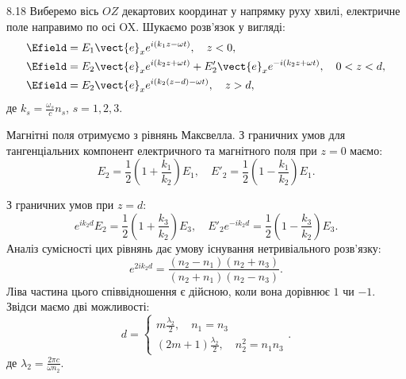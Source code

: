 \begin{Solution}{8.{18}}
    Виберемо вісь $OZ$ декартових координат у напрямку руху хвилі, електричне поле направимо по осі OX. Шукаємо розв’язок у вигляді:
    \begin{align*}
        \Efield &= E_1\vect{e}_x e^{i(k_1z - \omega t)}, \quad z<0, \\
        \Efield &= E_2\vect{e}_x e^{i(k_2z + \omega t)} + E'_2\vect{e}_x e^{-i(k_2z + \omega t)}, \quad 0<z<d, \\
        \Efield &= E_2\vect{e}_x e^{i(k_2(z-d) - \omega t)}, \quad z>d,
    \end{align*}
    де $k_s = \frac{\omega_s}{c}n_s$, $s = 1,2,3$.

    Магнітні поля отримуємо з рівнянь Максвелла. З граничних умов для тангенціальних компонент електричного та магнітного поля при $z = 0$ маємо:
    \[
        E_2 = \frac{1}{2}\left(1 + \frac{k_1}{k_2} \right){E_1}, \quad E'_2 = \frac{1}{2}\left( 1 - \frac{k_1}{k_2} \right){E_1}.
    \]

    З граничних умов при  $z = d$:
    \[
        e^{ik_2d}{E_2} = \frac{1}{2}\left( 1 + \frac{k_3}{k_2} \right)E_3, \quad E'_2e^{- ik_2d} = \frac{1}{2}\left( 1 - \frac{k_3}{k_2} \right)E_3.
    \]
    Аналіз сумісності цих рівнянь дає умову існування нетривіального розв’язку:
    \[
        e^{2ik_2d} = \frac{(n_2 - n_1)(n_2 + n_3)}{(n_2 + n_1)(n_2 - n_3)}.
    \]
    Ліва частина цього співвідношення є дійсною, коли вона дорівнює $1$ чи $-1$. Звідси маємо дві можливості:
    \begin{equation*}
    d=
    \begin{cases}
    m\frac{\lambda_2}{2}, \quad n_1 = n_3\\
    (2m+1)\frac{\lambda_2}{2}, \quad n_2^2 = n_1n_3
    \end{cases}.
    \end{equation*}
    де $\lambda_2 = \frac{2\pi c}{\omega n_2}$.
\end{Solution}
